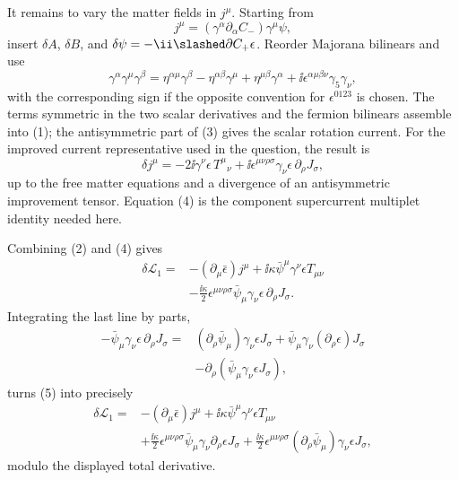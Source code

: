 \begin{enumerate}
  It remains to vary the matter fields in \(j^\mu\).  Starting from
  \[
    j^\mu=(\gamma^\alpha\partial_\alpha C_-)\gamma^\mu\psi,
  \]
  insert \(\delta A\), \(\delta B\), and
  \(\delta\psi=-\ii\slashed\partial C_+\epsilon\).  Reorder Majorana
  bilinears and use
  \[
    \gamma^\alpha\gamma^\mu\gamma^\beta
      =\eta^{\alpha\mu}\gamma^\beta
       -\eta^{\alpha\beta}\gamma^\mu
       +\eta^{\mu\beta}\gamma^\alpha
       +\ii\epsilon^{\alpha\mu\beta\nu}\gamma_5\gamma_\nu,
  \tag{3}
  \]
  with the corresponding sign if the opposite convention for
  \(\epsilon^{0123}\) is chosen.  The terms symmetric in the two scalar
  derivatives and the fermion bilinears assemble into (1); the
  antisymmetric part of (3) gives the scalar rotation current.  For the
  improved current representative used in the question, the result is
  \[
    \delta j^\mu
      =-2\ii\gamma^\nu\epsilon\,T^\mu{}_{\nu}
       +\ii\epsilon^{\mu\nu\rho\sigma}\gamma_\nu\epsilon\,
          \partial_\rho J_\sigma,
  \tag{4}
  \]
  up to the free matter equations and a divergence of an antisymmetric
  improvement tensor.  Equation (4) is the component supercurrent
  multiplet identity needed here.

  Combining (2) and (4) gives
  \[
  \begin{split}
    \delta\mathcal L_1={}&-(\partial_\mu\bar\epsilon)j^\mu
      +\ii\kappa\bar\psi^\mu\gamma^\nu\epsilon T_{\mu\nu}\\
      &-\frac{\ii\kappa}{2}\epsilon^{\mu\nu\rho\sigma}
       \bar\psi_\mu\gamma_\nu\epsilon\,\partial_\rho J_\sigma.
  \end{split}
  \tag{5}
  \]
  Integrating the last line by parts,
  \[
  \begin{split}
    -\bar\psi_\mu\gamma_\nu\epsilon\,\partial_\rho J_\sigma
      ={}&(\partial_\rho\bar\psi_\mu)\gamma_\nu\epsilon J_\sigma
       +\bar\psi_\mu\gamma_\nu(\partial_\rho\epsilon)J_\sigma\\
       &-\partial_\rho
          (\bar\psi_\mu\gamma_\nu\epsilon J_\sigma),
  \end{split}
  \]
  turns (5) into precisely
  \[
  \begin{split}
    \delta\mathcal L_1={}&-(\partial_\mu\bar\epsilon)j^\mu
      +\ii\kappa\bar\psi^\mu\gamma^\nu\epsilon T_{\mu\nu}\\
      &+\frac{\ii\kappa}{2}\epsilon^{\mu\nu\rho\sigma}
        \bar\psi_\mu\gamma_\nu\partial_\rho\epsilon J_\sigma
       +\frac{\ii\kappa}{2}\epsilon^{\mu\nu\rho\sigma}
        (\partial_\rho\bar\psi_\mu)\gamma_\nu\epsilon J_\sigma,
  \end{split}
  \]
  modulo the displayed total derivative.


\end{enumerate}
